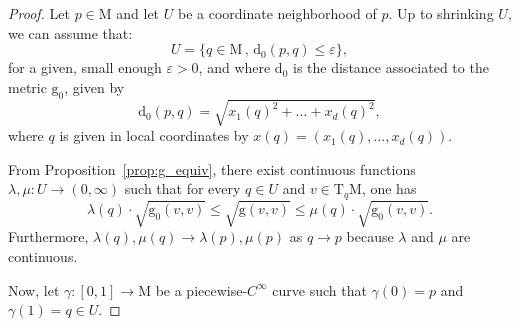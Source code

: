 \documentclass[10pt,a4paper]{amsart}
\newcommand{\dis}{\mathrm{d}}
\newcommand{\eps}{\varepsilon}
\newcommand{\g}{\mathrm{g}}
\newcommand{\man}{\mathrm{M}}
\newcommand{\tangent}{\mathrm{T}}
\begin{document}
\begin{proof}
Let $p\in\man$ and let $U$ be a coordinate neighborhood of $p$.
Up to shrinking $U$, we can assume that:
$$U=\{q\in\man\, ,\, \dis_0(p,q)\leq\eps\},$$
for a given, small enough $\eps>0$, and where $\dis_0$ is the distance associated to the metric $\g_0$, given by 
$$\dis_0(p,q)=\sqrt{x_1(q)^2+\dots+x_d(q)^2},$$
where $q$ is given in local coordinates by $x(q)=(x_1(q),...,x_d(q))$.

From Proposition~\ref{prop:g_equiv}, there exist continuous functions $\lambda,\mu\colon U\rightarrow(0,\infty)$ such that for every $q\in U$ and $v\in\tangent_q\man$, one has
$$\lambda(q)\cdot \sqrt{\g_0(v,v)}\leq \sqrt{\g(v,v)}\leq \mu(q)\cdot \sqrt{\g_0(v,v)}.$$
Furthermore, $\lambda(q),\mu(q)\rightarrow \lambda(p),\mu(p)$ as $q\rightarrow p$ because $\lambda$ and $\mu$ are continuous.

Now, let $\gamma\colon[0,1]\rightarrow\man$ be a piecewise-$C^{\infty}$ curve such that $\gamma(0)=p$ and $\gamma(1)=q\in U$.


\end{proof}
\end{document}
